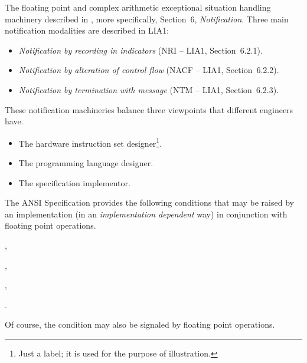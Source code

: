 \documentclass[../Description.tex]{subfiles}
\begin{document}
\label{sect:notifications}

The floating point and complex arithmetic exceptional situation
handling machinery described in
\cite{2012:LIA1,2001:LIA2,2004:LIA3,2008:IEEE-754}, more specifically,
\cite{2012:LIA1} Section~6, \emph{Notification}.  Three main
notification modalities are described in LIA1:
\begin{itemize}
\item \emph{Notification by recording in indicators} (NRI -- LIA1,
  Section~6.2.1).
\item \emph{Notification by alteration of control flow} (NACF -- LIA1,
  Section~6.2.2).
\item \emph{Notification by termination with message} (NTM -- LIA1,
  Section~6.2.3).
\end{itemize}

\noindent
These notification machineries balance three viewpoints that different
engineers have.

\begin{itemize}
\item The hardware instruction set designer\footnote{Just a label; it
    is used for the purpose of illustration.}.
\item The programming language designer.
\item The specification implementor.
\end{itemize}

The \CL{} ANSI Specification provides the following conditions that
may be raised by an implementation (in an \emph{implementation
  dependent} way) in conjunction with floating point operations.
\begin{description}
\item {},
\item {},
\item {},
\item {}.
\end{description}
Of course, the condition  may also be signaled
by floating point operations.
\end{document}
